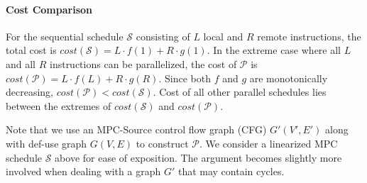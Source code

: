 \paragraph{Cost Comparison} For the sequential schedule $\mathcal{S}$ consisting of $L$ local and $R$ remote instructions, the total cost is $\mathit{cost}(\mathcal{S}) = L \cdot f(1) + R \cdot g(1)$. In the extreme case where all $L$ and all $R$ instructions can be parallelized, the cost of $\mathcal{P}$ is $\mathit{cost}(\mathcal{P}) = L \cdot f(L) + R \cdot g(R)$. Since both $f$ and $g$ are monotonically decreasing, $\mathit{cost}(\mathcal{P}) < \mathit{cost}(\mathcal{S})$. Cost of all other parallel schedules lies between the extremes of $\mathit{cost}(\mathcal{S})$ and $\mathit{cost}(\mathcal{P})$.

Note that we use an MPC-Source control flow graph (CFG) $G'(V', E')$ along with def-use graph $G(V,E)$ to construct $\mathcal{P}$. We consider a linearized MPC schedule $\mathcal{S}$ above for ease of exposition. The argument becomes slightly more involved when dealing with a graph $G'$ that may contain cycles.





